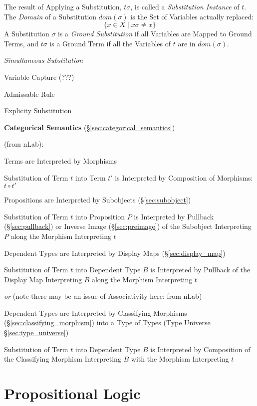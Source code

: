 The result of Applying a Substitution, $t\sigma$, is called a
\emph{Substitution Instance} of $t$. The \emph{Domain} of a
Substitution $dom(\sigma)$ is the Set of Variables actually replaced:
\[
  \{ x \in X \;|\; x\sigma \neq x \}
\]
A Substitution $\sigma$ is a \emph{Ground Substitution} if all
Variables are Mapped to Ground Terms, and $t\sigma$ is a Ground Term
if all the Variables of $t$ are in $dom(\sigma)$.

\emph{Simultaneous Substitution}

Variable Capture (???)

Admissable Rule

Explicity Substitution


\textbf{Categorical Semantics} (\S\ref{sec:categorical_semantics})

(from nLab): %

Terms are Interpreted by Morphisms

Substitution of Term $t$ into Term $t'$ is Interpreted by Composition
of Morphisms: $t \circ t'$

Propositions are Interpreted by Subobjects (\S\ref{sec:subobject})

Substitution of Term $t$ into Proposition $P$ is Interpreted by
Pullback (\S\ref{sec:pullback}) or Inverse Image
(\S\ref{sec:preimage}) of the Subobject Interpreting $P$ along the
Morphism Interpreting $t$

Dependent Types are Interpreted by Display Maps
(\S\ref{sec:display_map})

Substitution of Term $t$ into Dependent Type $B$ is Interpreted by
Pullback of the Display Map Interpreting $B$ along the Morphism
Interpreting $t$

\emph{or} (note there may be an issue of Associativity here: from nLab)

Dependent Types are Interpreted by Classifying Morphisms
(\S\ref{sec:classifying_morphism}) into a Type of Types (Type Universe
\S\ref{sec:type_universe})

Substitution of Term $t$ into Dependent Type $B$ is Interpreted by
Composition of the Classifying Morphism Interpreting $B$ with the
Morphism Interpreting $t$



\section{Propositional Logic}\label{sec:propositional_logic}

